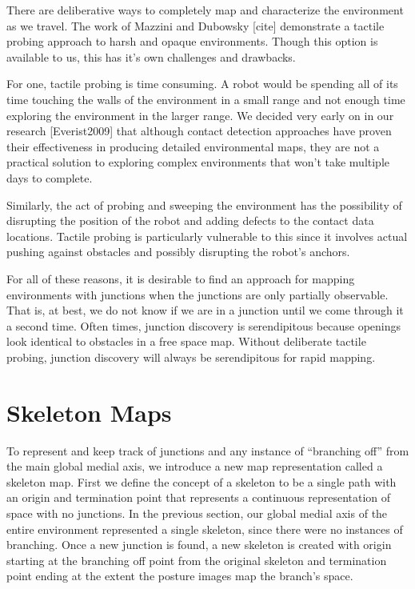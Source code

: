There are deliberative ways to completely map and characterize the environment as we travel. The work of Mazzini and Dubowsky [cite] demonstrate a tactile probing approach to harsh and opaque environments. Though this option is available to us, this has it's own challenges and drawbacks.

For one, tactile probing is time consuming. A robot would be spending all of its time touching the walls of the environment in a small range and not enough time exploring the environment in the larger range. We decided very early on in our research [Everist2009] that although contact detection approaches have proven their effectiveness in producing detailed environmental maps, they are not a practical solution to exploring complex environments that won't take multiple days to complete.

Similarly, the act of probing and sweeping the environment has the possibility of disrupting the position of the robot and adding defects to the contact data locations. Tactile probing is particularly vulnerable to this since it involves actual pushing against obstacles and possibly disrupting the robot's anchors.

For all of these reasons, it is desirable to find an approach for mapping environments with junctions when the junctions are only partially observable. That is, at best, we do not know if we are in a junction until we come through it a second time. Often times, junction discovery is serendipitous because openings look identical to obstacles in a free space map. Without deliberate tactile probing, junction discovery will always be serendipitous for rapid mapping.

\section{Skeleton Maps}
\label{skeletonmaps}

To represent and keep track of junctions and any instance of “branching off” from the main global medial axis, we introduce a new map representation called a skeleton map. First we define the concept of a skeleton to be a single path with an origin and termination point that represents a continuous representation of space with no junctions. In the previous section, our global medial axis of the entire environment represented a single skeleton, since there were no instances of branching. Once a new junction is found, a new skeleton is created with origin starting at the branching off point from the original skeleton and termination point ending at the extent the posture images map the branch's space. 

